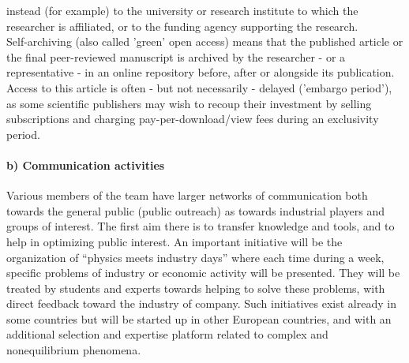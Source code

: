 {\begin{compactitem}
    instead (for example) to the university or research institute to which the
    researcher is affiliated, or to the funding agency supporting the research.\\
%
    Self-archiving (also called 'green' open access) means that the published
    article or the final peer-reviewed manuscript is archived by the researcher
    - or a representative - in an online repository before, after or alongside
    its publication.  Access to this article is often - but not necessarily -
    delayed ('embargo period'), as some scientific publishers may wish to recoup
    their investment by selling subscriptions and charging pay-per-download/view
    fees during an exclusivity period.
%
  \end{compactitem}
}

\paragraph{b) Communication activities}


Various members of the team have larger networks of communication both towards the general public (public outreach) as towards industrial players and groups of interest.  The first aim there is to transfer knowledge and tools, and to help in optimizing public interest. An important initiative will be the organization of ``physics meets industry days''
where each time during a week, specific problems of industry or economic activity will be presented.  They will be treated by students and experts towards helping to solve these problems, with direct feedback toward the industry of company.  Such initiatives exist already in some countries but will be started up in other European countries, and with an additional selection and expertise platform related to complex and nonequilibrium phenomena.



